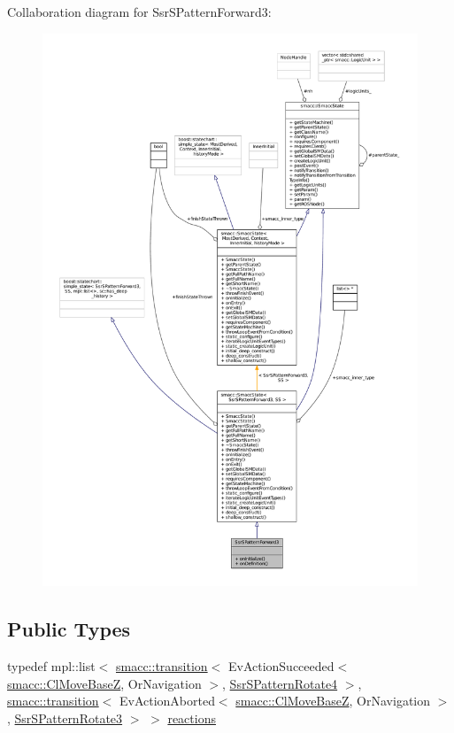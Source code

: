 Collaboration diagram for Ssr\+S\+Pattern\+Forward3\+:
\nopagebreak
\begin{figure}[H]
\begin{center}
\leavevmode
\includegraphics[width=350pt]{structSsrSPatternForward3__coll__graph}
\end{center}
\end{figure}
\subsection*{Public Types}
\begin{DoxyCompactItemize}
\item 
typedef mpl\+::list$<$ \hyperlink{classsmacc_1_1transition}{smacc\+::transition}$<$ Ev\+Action\+Succeeded$<$ \hyperlink{classsmacc_1_1ClMoveBaseZ}{smacc\+::\+Cl\+Move\+BaseZ}, Or\+Navigation $>$, \hyperlink{structSsrSPatternRotate4}{Ssr\+S\+Pattern\+Rotate4} $>$, \hyperlink{classsmacc_1_1transition}{smacc\+::transition}$<$ Ev\+Action\+Aborted$<$ \hyperlink{classsmacc_1_1ClMoveBaseZ}{smacc\+::\+Cl\+Move\+BaseZ}, Or\+Navigation $>$, \hyperlink{structSsrSPatternRotate3}{Ssr\+S\+Pattern\+Rotate3} $>$ $>$ \hyperlink{structSsrSPatternForward3_a37f21050153ee9cdbb6fef930b00a52d}{reactions}
\end{DoxyCompactItemize}
